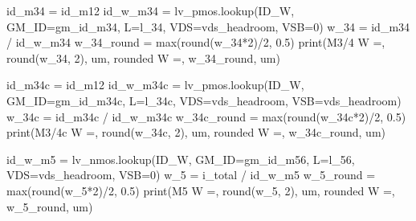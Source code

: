 \documentclass[
  a4paper,
  DIV=11,
  numbers=noendperiod]{scrartcl}
\newenvironment{Shaded}{\begin{snugshade}}{\end{snugshade}}
\newcommand{\BuiltInTok}[1]{\textcolor[rgb]{0.00,0.23,0.31}{#1}}
\newcommand{\DecValTok}[1]{\textcolor[rgb]{0.68,0.00,0.00}{#1}}
\newcommand{\FloatTok}[1]{\textcolor[rgb]{0.68,0.00,0.00}{#1}}
\newcommand{\NormalTok}[1]{\textcolor[rgb]{0.00,0.23,0.31}{#1}}
\newcommand{\OperatorTok}[1]{\textcolor[rgb]{0.37,0.37,0.37}{#1}}
\newcommand{\StringTok}[1]{\textcolor[rgb]{0.13,0.47,0.30}{#1}}
\begin{document}
\begin{tcolorbox}
\begin{Shaded}
\begin{Highlighting}[]
\NormalTok{id\_m34 }\OperatorTok{=}\NormalTok{ id\_m12}
\NormalTok{id\_w\_m34 }\OperatorTok{=}\NormalTok{ lv\_pmos.lookup(}\StringTok{\textquotesingle{}ID\_W\textquotesingle{}}\NormalTok{, GM\_ID}\OperatorTok{=}\NormalTok{gm\_id\_m34, L}\OperatorTok{=}\NormalTok{l\_34, VDS}\OperatorTok{=}\NormalTok{vds\_headroom, VSB}\OperatorTok{=}\DecValTok{0}\NormalTok{)}
\NormalTok{w\_34 }\OperatorTok{=}\NormalTok{ id\_m34 }\OperatorTok{/}\NormalTok{ id\_w\_m34}
\NormalTok{w\_34\_round }\OperatorTok{=} \BuiltInTok{max}\NormalTok{(}\BuiltInTok{round}\NormalTok{(w\_34}\OperatorTok{*}\DecValTok{2}\NormalTok{)}\OperatorTok{/}\DecValTok{2}\NormalTok{, }\FloatTok{0.5}\NormalTok{) }
\BuiltInTok{print}\NormalTok{(}\StringTok{\textquotesingle{}M3/4  W =\textquotesingle{}}\NormalTok{, }\BuiltInTok{round}\NormalTok{(w\_34, }\DecValTok{2}\NormalTok{), }\StringTok{\textquotesingle{}um, rounded W =\textquotesingle{}}\NormalTok{, w\_34\_round, }\StringTok{\textquotesingle{}um\textquotesingle{}}\NormalTok{)}

\NormalTok{id\_m34c }\OperatorTok{=}\NormalTok{ id\_m12}
\NormalTok{id\_w\_m34c }\OperatorTok{=}\NormalTok{ lv\_pmos.lookup(}\StringTok{\textquotesingle{}ID\_W\textquotesingle{}}\NormalTok{, GM\_ID}\OperatorTok{=}\NormalTok{gm\_id\_m34c, L}\OperatorTok{=}\NormalTok{l\_34c, VDS}\OperatorTok{=}\NormalTok{vds\_headroom, VSB}\OperatorTok{=}\NormalTok{vds\_headroom)}
\NormalTok{w\_34c }\OperatorTok{=}\NormalTok{ id\_m34c }\OperatorTok{/}\NormalTok{ id\_w\_m34c}
\NormalTok{w\_34c\_round }\OperatorTok{=} \BuiltInTok{max}\NormalTok{(}\BuiltInTok{round}\NormalTok{(w\_34c}\OperatorTok{*}\DecValTok{2}\NormalTok{)}\OperatorTok{/}\DecValTok{2}\NormalTok{, }\FloatTok{0.5}\NormalTok{) }
\BuiltInTok{print}\NormalTok{(}\StringTok{\textquotesingle{}M3/4c W =\textquotesingle{}}\NormalTok{, }\BuiltInTok{round}\NormalTok{(w\_34c, }\DecValTok{2}\NormalTok{), }\StringTok{\textquotesingle{}um, rounded W =\textquotesingle{}}\NormalTok{, w\_34c\_round, }\StringTok{\textquotesingle{}um\textquotesingle{}}\NormalTok{)}

\NormalTok{id\_w\_m5 }\OperatorTok{=}\NormalTok{ lv\_nmos.lookup(}\StringTok{\textquotesingle{}ID\_W\textquotesingle{}}\NormalTok{, GM\_ID}\OperatorTok{=}\NormalTok{gm\_id\_m56, L}\OperatorTok{=}\NormalTok{l\_56, VDS}\OperatorTok{=}\NormalTok{vds\_headroom, VSB}\OperatorTok{=}\DecValTok{0}\NormalTok{)}
\NormalTok{w\_5 }\OperatorTok{=}\NormalTok{ i\_total }\OperatorTok{/}\NormalTok{ id\_w\_m5}
\NormalTok{w\_5\_round }\OperatorTok{=} \BuiltInTok{max}\NormalTok{(}\BuiltInTok{round}\NormalTok{(w\_5}\OperatorTok{*}\DecValTok{2}\NormalTok{)}\OperatorTok{/}\DecValTok{2}\NormalTok{, }\FloatTok{0.5}\NormalTok{)}
\BuiltInTok{print}\NormalTok{(}\StringTok{\textquotesingle{}M5    W =\textquotesingle{}}\NormalTok{, }\BuiltInTok{round}\NormalTok{(w\_5, }\DecValTok{2}\NormalTok{), }\StringTok{\textquotesingle{}um, rounded W =\textquotesingle{}}\NormalTok{, w\_5\_round, }\StringTok{\textquotesingle{}um\textquotesingle{}}\NormalTok{)}


\end{Highlighting}
\end{Shaded}
\end{tcolorbox}
\end{document}
